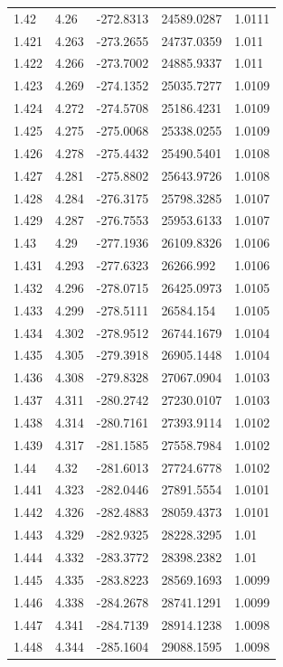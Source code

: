 \begin{tabular}{lllll}
1.42 & 4.26 & -272.8313 & 24589.0287 & 1.0111 \\
1.421 & 4.263 & -273.2655 & 24737.0359 & 1.011 \\
1.422 & 4.266 & -273.7002 & 24885.9337 & 1.011 \\
1.423 & 4.269 & -274.1352 & 25035.7277 & 1.0109 \\
1.424 & 4.272 & -274.5708 & 25186.4231 & 1.0109 \\
1.425 & 4.275 & -275.0068 & 25338.0255 & 1.0109 \\
1.426 & 4.278 & -275.4432 & 25490.5401 & 1.0108 \\
1.427 & 4.281 & -275.8802 & 25643.9726 & 1.0108 \\
1.428 & 4.284 & -276.3175 & 25798.3285 & 1.0107 \\
1.429 & 4.287 & -276.7553 & 25953.6133 & 1.0107 \\
1.43 & 4.29 & -277.1936 & 26109.8326 & 1.0106 \\
1.431 & 4.293 & -277.6323 & 26266.992 & 1.0106 \\
1.432 & 4.296 & -278.0715 & 26425.0973 & 1.0105 \\
1.433 & 4.299 & -278.5111 & 26584.154 & 1.0105 \\
1.434 & 4.302 & -278.9512 & 26744.1679 & 1.0104 \\
1.435 & 4.305 & -279.3918 & 26905.1448 & 1.0104 \\
1.436 & 4.308 & -279.8328 & 27067.0904 & 1.0103 \\
1.437 & 4.311 & -280.2742 & 27230.0107 & 1.0103 \\
1.438 & 4.314 & -280.7161 & 27393.9114 & 1.0102 \\
1.439 & 4.317 & -281.1585 & 27558.7984 & 1.0102 \\
1.44 & 4.32 & -281.6013 & 27724.6778 & 1.0102 \\
1.441 & 4.323 & -282.0446 & 27891.5554 & 1.0101 \\
1.442 & 4.326 & -282.4883 & 28059.4373 & 1.0101 \\
1.443 & 4.329 & -282.9325 & 28228.3295 & 1.01 \\
1.444 & 4.332 & -283.3772 & 28398.2382 & 1.01 \\
1.445 & 4.335 & -283.8223 & 28569.1693 & 1.0099 \\
1.446 & 4.338 & -284.2678 & 28741.1291 & 1.0099 \\
1.447 & 4.341 & -284.7139 & 28914.1238 & 1.0098 \\
1.448 & 4.344 & -285.1604 & 29088.1595 & 1.0098 \\

\end{tabular}
